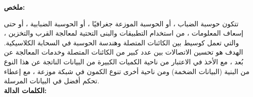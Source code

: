\begin{otherlanguage}{arabic}

    \textsc{\textbf{ملخص:}}
    
    تتكون حوسبة الضباب ، أو الحوسبة الموزعة جغرافيًا ، أو الحوسبة الضبابية ، أو حتى إسعاف المعلومات ، من استخدام التطبيقات والبنى التحتية لمعالجة القرب والتخزين ، والتي تعمل كوسيط بين الكائنات المتصلة وهندسة الحوسبة في السحابة الكلاسيكية. الهدف هو تحسين الاتصالات بين عدد كبير من الكائنات المتصلة وخدمات المعالجة عن بُعد ، مع الأخذ في الاعتبار من ناحية الكميات الكبيرة من البيانات الناتجة عن هذا النوع من البنية (البيانات الضخمة) ومن ناحية أخرى تنوع الكمون في شبكة موزعة ، مع إعطاء تحكم أفضل في البيانات المرسلة.
    \\
    \textsc{\textbf{الكلمات الدالة: }\\}
    \end{otherlanguage}